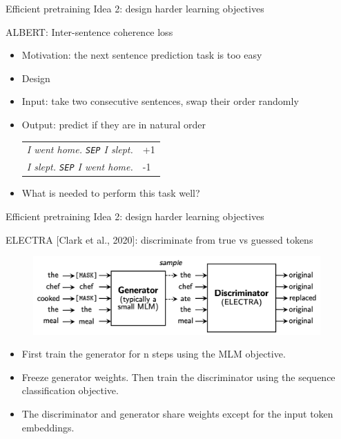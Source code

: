 \documentclass[usenames,dvipsnames,notes,11pt,aspectratio=169,hyperref={colorlinks=true, linkcolor=blue}]{beamer}
\begin{document}
\begin{frame}
    {Efficient pretraining}
    Idea 2: design harder learning objectives

    ALBERT: Inter-sentence coherence loss\\
    \begin{itemize}
        \item Motivation: the next sentence prediction task is too easy
        \item Design 
        \item Input: take two consecutive sentences, swap their order randomly
        \item Output: predict if they are in natural order\\
            \begin{tabular}{ll}
                \textit{I went home. \texttt{SEP} I slept.} & +1\\
                \textit{I slept. \texttt{SEP} I went home.} & -1\\
            \end{tabular}
            
        \item What is needed to perform this task well?
    \end{itemize}
\end{frame}

\begin{frame}
    {Efficient pretraining}
    Idea 2: design harder learning objectives

    ELECTRA [Clark et al., 2020]: discriminate from true vs guessed tokens

    \vspace{-1em}
    \begin{figure}
        \includegraphics[height=3cm]{figures/electra}
    \end{figure}
    \vspace{-1em}

    \begin{itemize}
        \item First train the generator for n steps using the MLM objective.
        \item Freeze generator weights. Then train the discriminator using the sequence classification objective.
        \item The discriminator and generator share weights except for the input token embeddings.
    \end{itemize}
\end{frame}
\end{document}
